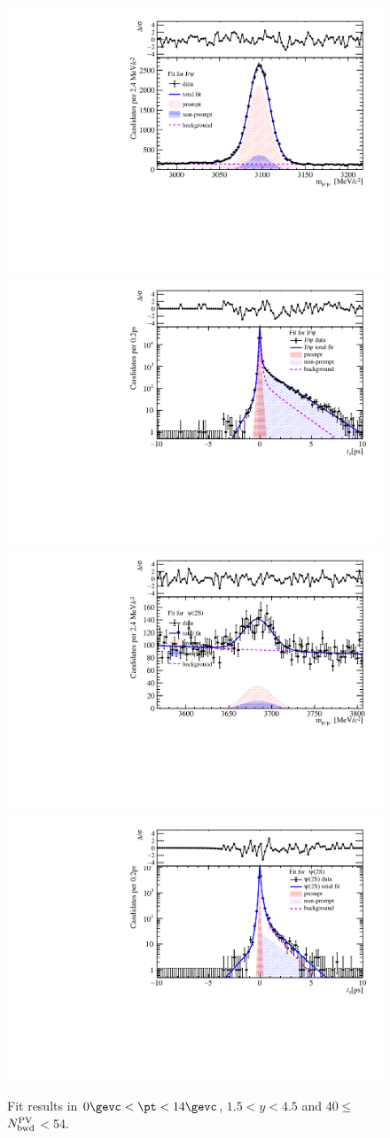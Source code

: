 \begin{figure}[H]
\begin{center}
\includegraphics[width=0.45\linewidth]{pdf/pPb/BWorkdir/TwoDimFit/ProjMass/Jpsi_n4y1pt1.pdf}
\includegraphics[width=0.45\linewidth]{pdf/pPb/BWorkdir/TwoDimFit/ProjTz/Jpsi_n4y1pt1.pdf}
\vspace*{-0.5cm}
\includegraphics[width=0.45\linewidth]{pdf/pPb/BWorkdir/TwoDimFit/ProjMass/Psi2S_n4y1pt1.pdf}
\includegraphics[width=0.45\linewidth]{pdf/pPb/BWorkdir/TwoDimFit/ProjTz/Psi2S_n4y1pt1.pdf}
\vspace*{-0.5cm}
\end{center}
\caption{Fit results in $0\gevc<\pt<14\gevc$, $1.5<y<4.5$ and 40$\leq$$N^{\rm PV}_{\rm bwd}$$<$54.}
\end{figure}
